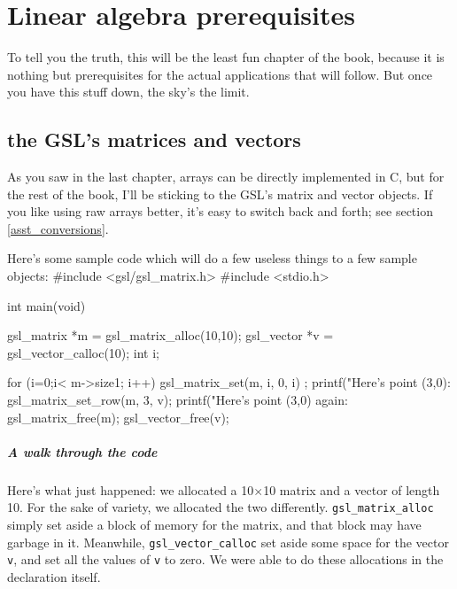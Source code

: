 \chapter[Linear Algebra]{Linear algebra prerequisites} \label{linear_algebra}

To tell you the truth, this will be the least fun chapter of the book,
because it is nothing but prerequisites for the actual applications that
will follow. But once you have this stuff down, the sky's the limit. 

\section{the GSL's matrices and vectors}
As you saw in the last chapter, arrays can be directly implemented in C, but for
the rest of the book, I'll be sticking to the GSL's matrix and vector objects.
If you like using raw arrays better, it's easy to switch back and forth; see
section \ref{asst_conversions}.


Here's some sample code which will do a few useless things to a few sample
objects:\label{gslexample}
#include <gsl/gsl_matrix.h>
#include <stdio.h>


int main(void){
   gsl_matrix   *m = gsl_matrix_alloc(10,10);
   gsl_vector   *v = gsl_vector_calloc(10);
   int  i;

   for (i=0;i< m->size1; i++){
      gsl_matrix_set(m, i, 0, i) ;
   }
   printf("Here's point (3,0): %
   gsl_matrix_set_row(m, 3, v);
   printf("Here's point (3,0) again: %
   gsl_matrix_free(m);
   gsl_vector_free(v);
}

\paragraph{A walk through the code}
Here's what just happened: we allocated a 10$\times$10 matrix and a vector of
length 10.  For the sake of variety, we  allocated the two differently.
{\tt gsl\_matrix\_alloc} simply set aside a block of memory for the matrix,
and that block may have garbage in it. Meanwhile, {\tt gsl\_vector\_calloc} set
aside some space for the vector {\tt v}, and set all the values of {\tt v} to
zero.  We were able to do these allocations in the declaration itself.

